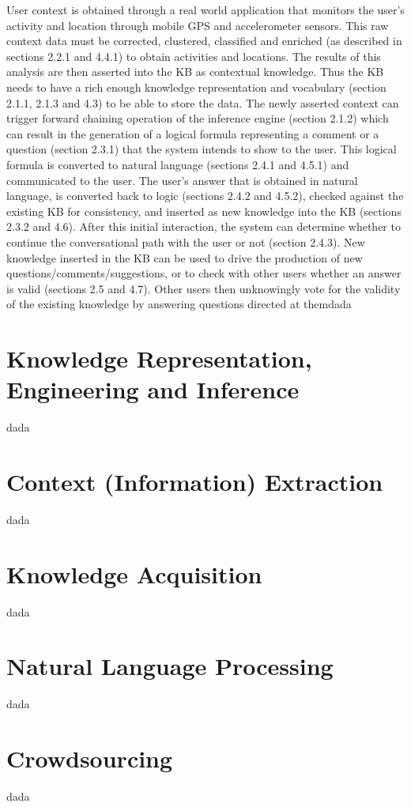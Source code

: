  User context is obtained through a real world application that monitors the user’s activity and location through mobile GPS and accelerometer sensors. This raw context data must be corrected, clustered, classified and enriched (as described in sections 2.2.1 and 4.4.1) to obtain activities and locations. The results of this analysis are then asserted into the KB as contextual knowledge. Thus the KB needs to have a rich enough knowledge representation and vocabulary (section 2.1.1, 2.1.3 and 4.3) to be able to store the data. The newly asserted context can trigger forward chaining operation of the inference engine (section 2.1.2) which can result in the generation of a logical formula representing a comment or a question (section 2.3.1) that the system intends to show to the user. This logical formula is converted to natural language (sections 2.4.1 and 4.5.1) and communicated to the user. The user’s answer that is obtained in natural language, is converted back to logic (sections 2.4.2 and 4.5.2), checked against the existing KB for consistency, and inserted as new knowledge into the KB (sections 2.3.2 and 4.6). After this initial interaction, the system can determine whether to continue the conversational path with the user or not (section 2.4.3). New knowledge inserted in the KB can be used to drive the production of new questions/comments/suggestions, or to check with other users whether an answer is valid (sections 2.5 and 4.7). Other users then unknowingly vote for the validity of the existing knowledge by answering questions directed at themdada

\section{Knowledge Representation, Engineering and Inference}
\label{section:bg:knowledge}
dada

\section{Context (Information) Extraction}
\label{section:bg:context}
dada

\section{Knowledge Acquisition}
\label{section:bg:ka}
dada

\section{Natural Language Processing}
\label{section:bg:nlp}
dada

\section{Crowdsourcing}
\label{section:bg:crowdsourcing}
dada
